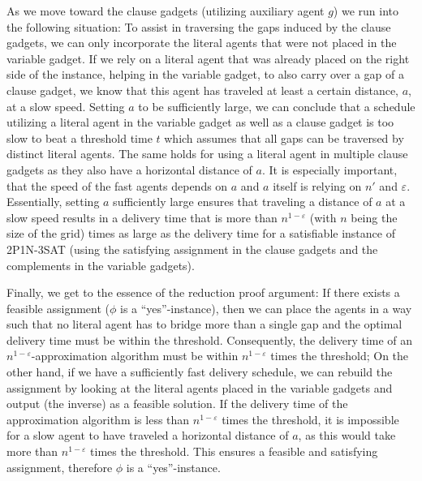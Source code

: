 
As we move toward the clause gadgets (utilizing auxiliary agent $g$) we run into the following situation: To assist in traversing the gaps induced by the clause gadgets, we can only incorporate the  %
literal agents that were not placed in the variable gadget. If we rely on a literal agent that was already placed on the right side of the instance, helping in the variable gadget, to also carry over a gap of a clause gadget,
we know that this agent has traveled at least a certain distance, $a$, at a slow speed.
Setting $a$ to be sufficiently large, we can conclude that a schedule utilizing a literal agent in the variable gadget as well as a clause gadget is too slow to beat a threshold time $t$ which assumes that all gaps can be traversed by distinct literal agents. The same holds for using a literal agent in multiple clause gadgets as they also have a horizontal distance of $a$. It is especially important, that the speed of the fast agents depends on $a$ and $a$ itself is relying on $n'$ and $\varepsilon$. 
Essentially, setting $a$ sufficiently large ensures that traveling a distance of $a$ at a slow speed results in a delivery time that is more than  
$n^{1-\varepsilon}$ (with $n$ being the size of the grid) times as large as the delivery time for a satisfiable instance of \textsc{2P1N-3SAT} (using the satisfying assignment in the clause gadgets and the complements in the variable gadgets).

Finally, we get to the essence of the reduction proof argument: 
If there exists a feasible assignment ($\phi$ is a ``yes''-instance), then we can place the agents in a way such that no literal agent has to bridge more than a single gap and the optimal delivery time must be within the threshold. Consequently, the delivery time of an $n^{1-\varepsilon}$-approximation algorithm must be within $n^{1-\varepsilon}$ times the threshold; On the other hand, if we have a sufficiently fast delivery schedule, we can rebuild the assignment by looking at the literal agents placed in the variable gadgets and output (the inverse) as a feasible solution. If the delivery time of the approximation algorithm is less than $n^{1-\varepsilon}$ times the threshold, it is impossible for a slow agent to have traveled a horizontal distance of $a$, as this would take more than $n^{1-\varepsilon}$ times the threshold. This ensures a feasible and satisfying assignment, therefore $\phi$ is a ``yes''-instance. 

